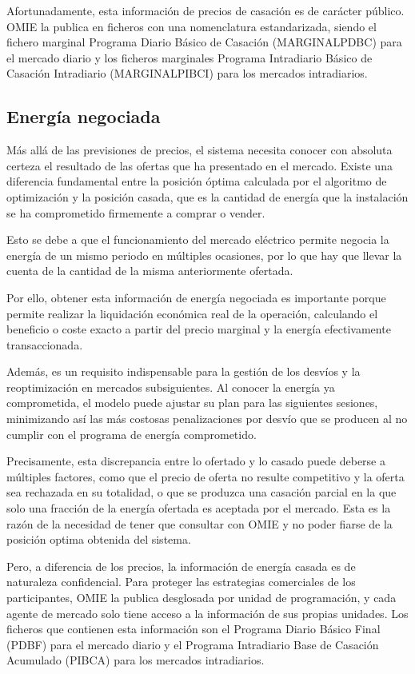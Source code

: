 Afortunadamente, esta información de precios de casación es de carácter público. OMIE la publica en ficheros con una nomenclatura estandarizada, siendo el fichero marginal Programa Diario Básico de Casación (MARGINALPDBC) para el mercado diario y los ficheros marginales Programa Intradiario Básico de Casación Intradiario (MARGINALPIBCI) para los mercados intradiarios.

\subsection{Energía negociada}
\label{makereference4.1.2}

Más allá de las previsiones de precios, el sistema necesita conocer con absoluta certeza el resultado de las ofertas que ha presentado en el mercado. Existe una diferencia fundamental entre la posición óptima calculada por el algoritmo de optimización y la posición casada, que es la cantidad de energía que la instalación se ha comprometido firmemente a comprar o vender.

Esto se debe a que el funcionamiento del mercado eléctrico permite negocia la energía de un mismo periodo en múltiples ocasiones, por lo que hay que llevar la cuenta de la cantidad de la misma anteriormente ofertada.

Por ello, obtener esta información de energía negociada es importante porque permite realizar la liquidación económica real de la operación, calculando el beneficio o coste exacto a partir del precio marginal y la energía efectivamente transaccionada.

Además, es un requisito indispensable para la gestión de los desvíos y la reoptimización en mercados subsiguientes. Al conocer la energía ya comprometida, el modelo puede ajustar su plan para las siguientes sesiones, minimizando así las más costosas penalizaciones por desvío que se producen al no cumplir con el programa de energía comprometido.

Precisamente, esta discrepancia entre lo ofertado y lo casado puede deberse a múltiples factores, como que el precio de oferta no resulte competitivo y la oferta sea rechazada en su totalidad, o que se produzca una casación parcial en la que solo una fracción de la energía ofertada es aceptada por el mercado. Esta es la razón de la necesidad de tener que consultar con OMIE y no poder fiarse de la posición optima obtenida del sistema.

Pero, a diferencia de los precios, la información de energía casada es de naturaleza confidencial. Para proteger las estrategias comerciales de los participantes, OMIE la publica desglosada por unidad de programación, y cada agente de mercado solo tiene acceso a la información de sus propias unidades. Los ficheros que contienen esta información son el Programa Diario Básico Final (PDBF) para el mercado diario y el Programa Intradiario Base de Casación Acumulado (PIBCA) para los mercados intradiarios.

